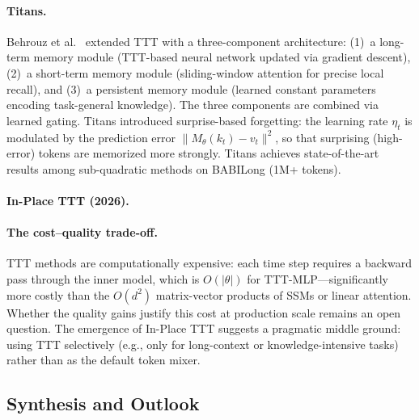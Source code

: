 \paragraph{Titans.}
Behrouz et al.~\cite{behrouz2024titans} extended TTT with a three-component architecture: (1)~a long-term memory module (TTT-based neural network updated via gradient descent), (2)~a short-term memory module (sliding-window attention for precise local recall), and (3)~a persistent memory module (learned constant parameters encoding task-general knowledge). The three components are combined via learned gating. Titans introduced surprise-based forgetting: the learning rate $\eta_t$ is modulated by the prediction error $\|M_\theta(k_t) - v_t\|^2$, so that surprising (high-error) tokens are memorized more strongly. Titans achieves state-of-the-art results among sub-quadratic methods on BABILong (1M+ tokens).

\paragraph{In-Place TTT (2026).}
\paragraph{The cost--quality trade-off.}
TTT methods are computationally expensive: each time step requires a backward pass through the inner model, which is $O(|\theta|)$ for TTT-MLP---significantly more costly than the $O(d^2)$ matrix-vector products of SSMs or linear attention. Whether the quality gains justify this cost at production scale remains an open question. The emergence of In-Place TTT suggests a pragmatic middle ground: using TTT selectively (e.g., only for long-context or knowledge-intensive tasks) rather than as the default token mixer.


\subsection{Synthesis and Outlook}
\label{subsec:token-mixer-outlook}

